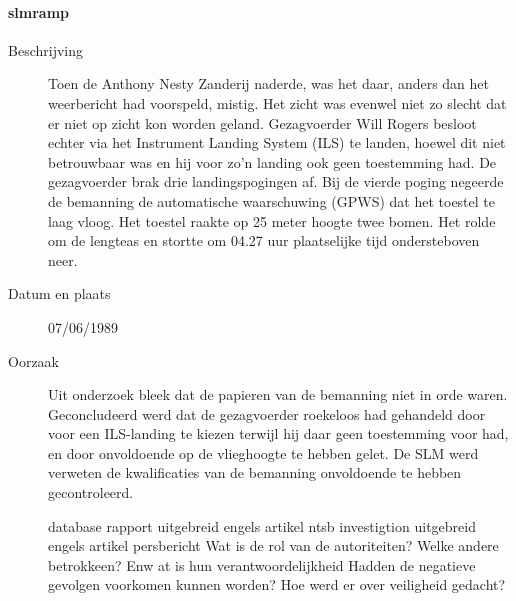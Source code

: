 \paragraph{slmramp}

\begin{description}
\item[Beschrijving]

Toen de Anthony Nesty Zanderij naderde, was het daar, anders dan het weerbericht had voorspeld, mistig. Het zicht was evenwel niet zo slecht dat er niet op zicht kon worden geland. Gezagvoerder Will Rogers besloot echter via het Instrument Landing System (ILS) te landen, hoewel dit niet betrouwbaar was en hij voor zo'n landing ook geen toestemming had. De gezagvoerder brak drie landingspogingen af. Bij de vierde poging negeerde de bemanning de automatische waarschuwing (GPWS) dat het toestel te laag vloog. Het toestel raakte op 25 meter hoogte twee bomen. Het rolde om de lengteas en stortte om 04.27 uur plaatselijke tijd ondersteboven neer.
\item[Datum en plaats] 07/06/1989
\item[Oorzaak]

Uit onderzoek bleek dat de papieren van de bemanning niet in orde waren. 
Geconcludeerd werd dat de gezagvoerder roekeloos had gehandeld door voor een ILS-landing te kiezen terwijl hij daar geen toestemming voor had, en door onvoldoende op de vlieghoogte te hebben gelet. 
De SLM werd verweten de kwalificaties van de bemanning onvoldoende te hebben gecontroleerd.



\cite{espnSLMterugblik}
\cite{dennisRosier01052020}
\cite{hassing07062020slmramp}
\cite{amsterdamArchiefSLM}
\cite{rtvOost06062019nabestaande}
\cite{breda07062021AndroSnel}
\cite{andereTijdenSLMCrash}
database
\cite{aviationReport}
rapport
\cite{aviationSLMCrashAccidentInvestigation}
\cite{mcDonnelDouglasCommissionReportSLMCrash}
\cite{wikiSRFlight764}
\cite{nos07062019SLMTerugblik}
\cite{dagvantoenSLMCrash}
\cite{waterkantNesty07061989}
uitgebreid engels artikel
\cite{eduNandlalSRCrash}
ntsb investigtion
\cite{oldjetsSRAirways}
uitgebreid engels artikel
\cite{cloudberg02012021srflight764}
persbericht
\cite{apnews07061989srplanecrash}
Wat is de rol van de autoriteiten?
Welke andere betrokkeen? Enw at is hun verantwoordelijkheid
Hadden de negatieve gevolgen voorkomen kunnen worden?
Hoe werd er over veiligheid gedacht?

\end{description}



